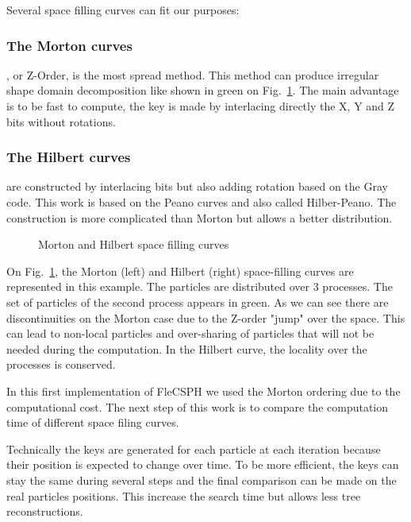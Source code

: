 Several space filling curves can fit our purposes:
\subsubsection*{The Morton curves} \cite{morton1966computer}, or Z-Order, is the most spread method. 
This method can produce irregular shape domain decomposition like shown in green on Fig.~\ref{fig:space_filling}. 
The main advantage is to be fast to compute, the key is made by interlacing directly the X, Y and Z bits without rotations. 
\subsubsection*{The Hilbert curves} \cite{sagan2012space} are constructed by interlacing bits but also adding rotation based on the Gray code.
This work is based on the Peano curves and also called Hilber-Peano. 
The construction is more complicated than Morton but allows a better distribution. 

\begin{figure}
\centering

\caption{Morton and Hilbert space filling curves}
\label{fig:space_filling}
\end{figure}

On Fig.~\ref{fig:space_filling}, the Morton (left) and Hilbert (right) space-filling curves are represented in this example.
The particles are distributed over 3 processes. 
The set of particles of the second process appears in green. 
As we can see there are discontinuities on the Morton case due to the Z-order "jump" over the space. 
This can lead to non-local particles and over-sharing of particles that will not be needed during the computation.
In the Hilbert curve, the locality over the processes is conserved.

In this first implementation of FleCSPH we used the Morton ordering due to the computational cost. 
The next step of this work is to compare the computation time of different space filing curves. 

Technically the keys are generated for each particle at each iteration because their position is expected to change over time. 
To be more efficient, the keys can stay the same during several steps and the final comparison can be made on the real particles positions. 
This increase the search time but allows less tree reconstructions.

